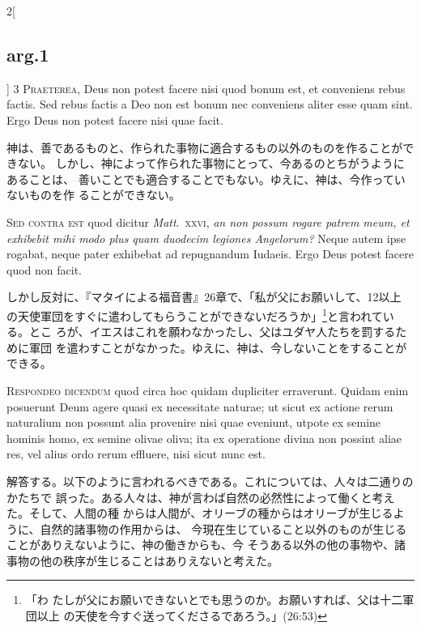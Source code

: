 \documentclass[paper=a4paper,fontsize=10pt,jafontsize=9pt,titlepage]{jlreq}
\begin{document}
\begin{paracol}{2}[\subsection{arg.1}]
{\scshape 3 Praeterea}, Deus non potest facere nisi quod
bonum est, et conveniens rebus factis. Sed rebus factis a Deo non est
bonum nec conveniens aliter esse quam sint. Ergo Deus non potest facere
nisi quae facit.

\switchcolumn

神は、善であるものと、作られた事物に適合するもの以外のものを作ることができない。
しかし、神によって作られた事物にとって、今あるのとちがうようにあることは、
 善いことでも適合することでもない。ゆえに、神は、今作っていないものを作
 ることができない。

\switchcolumn*[\subsection{s.c.}]

{\scshape Sed contra est} quod dicitur {\itshape Matt}.~{\scshape xxvi}, {\itshape an
non possum rogare patrem meum, et exhibebit mihi modo plus quam duodecim
legiones Angelorum?} Neque autem ipse rogabat, neque pater exhibebat ad
repugnandum Iudaeis. Ergo Deus potest facere quod non facit.

\switchcolumn

しかし反対に、『マタイによる福音書』26章で、「私が父にお願いして、12以上
の天使軍団をすぐに遣わしてもらうことができないだろうか」\footnote{「わ
たしが父にお願いできないとでも思うのか。お願いすれば、父は十二軍団以上
の天使を今すぐ送ってくださるであろう。」(26:53)}と言われている。とこ
ろが、イエスはこれを願わなかったし、父はユダヤ人たちを罰するために軍団
を遣わすことがなかった。ゆえに、神は、今しないことをすることができる。


{\scshape Respondeo dicendum} quod circa hoc quidam
dupliciter erraverunt. Quidam enim posuerunt Deum agere quasi ex
necessitate naturae; ut sicut ex actione rerum naturalium non possunt
alia provenire nisi quae eveniunt, utpote ex semine hominis homo, ex
semine olivae oliva; ita ex operatione divina non possint aliae res, vel
alius ordo rerum effluere, nisi sicut nunc est.

\switchcolumn

解答する。以下のように言われるべきである。これについては、人々は二通りのかたちで
誤った。ある人々は、神が言わば自然の必然性によって働くと考えた。そして、人間の種
からは人間が、オリーブの種からはオリーブが生じるように、自然的諸事物の作用からは、
今現在生じていること以外のものが生じることがありえないように、神の働きからも、今
そうある以外の他の事物や、諸事物の他の秩序が生じることはありえないと考えた。


\end{paracol}
\end{document}
